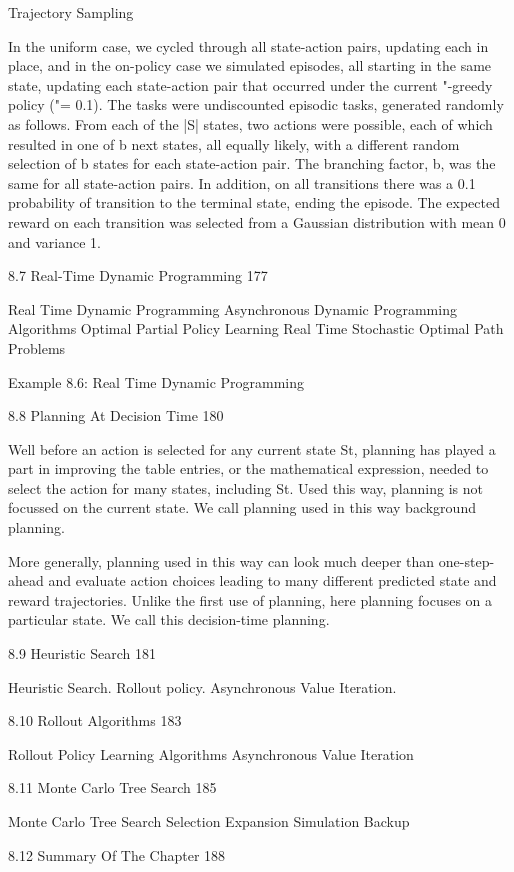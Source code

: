 Trajectory Sampling

In the uniform case, we cycled through all state-action pairs, updating each in place, and in the on-policy case we simulated episodes, all starting in the same state, updating each state-action pair that occurred under the current "-greedy policy ("= 0.1). The tasks were undiscounted episodic tasks, generated randomly as follows. From each of the |S| states, two actions were possible, each of which resulted in one of b next states, all equally likely, with a different random selection of b states for each state-action pair. The branching factor, b, was the same for all state-action pairs. In addition, on all transitions there was a 0.1 probability of transition to the terminal state, ending the episode. The expected reward on each transition was selected from a Gaussian distribution with mean 0 and variance 1.

8.7 Real-Time Dynamic Programming 177

Real Time Dynamic Programming
Asynchronous Dynamic Programming Algorithms
Optimal Partial Policy
Learning Real Time
Stochastic Optimal Path Problems

Example 8.6: Real Time Dynamic Programming

8.8 Planning At Decision Time 180

Well before an action is selected for any current state St, planning has played a part in improving the table entries, or the mathematical expression, needed to select the action for many states, including St. Used this way, planning is not focussed on the current state. We call planning used in this way background planning.

More generally, planning used in this way can look much deeper than one-step-ahead and evaluate action choices leading to many different predicted state and reward trajectories. Unlike the first use of planning, here planning focuses on a particular state. We call this decision-time planning.

8.9 Heuristic Search 181

Heuristic Search. Rollout policy. Asynchronous Value Iteration.

8.10 Rollout Algorithms 183

Rollout Policy
Learning Algorithms
Asynchronous Value Iteration

8.11 Monte Carlo Tree Search 185

Monte Carlo Tree Search
Selection
Expansion
Simulation
Backup

8.12 Summary Of The Chapter 188

